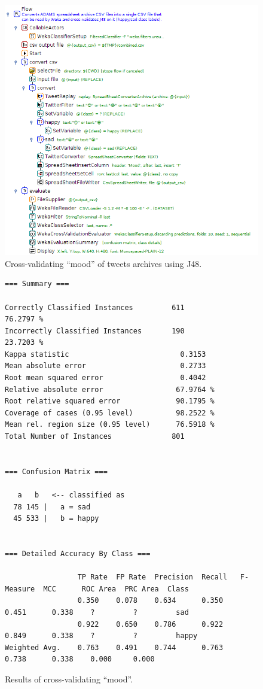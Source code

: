 \documentclass[a4paper,10pt]{book}
\begin{document}
\begin{figure}[htb]
  \centering
  \includegraphics[width=12.0cm]{images/crossvalidate_csv_archive-flow.png}
  \caption{Cross-validating ``mood'' of tweets archives using J48.}
  \label{crossvalidate_csv_archive-flow}
\end{figure}

\begin{figure}[htb]
  \centering
  {\scriptsize
  \begin{verbatim}
=== Summary ===

Correctly Classified Instances         611               76.2797 %
Incorrectly Classified Instances       190               23.7203 %
Kappa statistic                          0.3153
Mean absolute error                      0.2733
Root mean squared error                  0.4042
Relative absolute error                 67.9764 %
Root relative squared error             90.1795 %
Coverage of cases (0.95 level)          98.2522 %
Mean rel. region size (0.95 level)      76.5918 %
Total Number of Instances              801     


=== Confusion Matrix ===

   a   b   <-- classified as
  78 145 |   a = sad
  45 533 |   b = happy


=== Detailed Accuracy By Class ===

                 TP Rate  FP Rate  Precision  Recall   F-Measure  MCC      ROC Area  PRC Area  Class
                 0.350    0.078    0.634      0.350    0.451      0.338    ?         ?         sad
                 0.922    0.650    0.786      0.922    0.849      0.338    ?         ?         happy
Weighted Avg.    0.763    0.491    0.744      0.763    0.738      0.338    0.000     0.000     
  \end{verbatim}}
  \caption{Results of cross-validating ``mood''.}
  \label{crossvalidate_csv_archive-output}
\end{figure}
\end{document}
